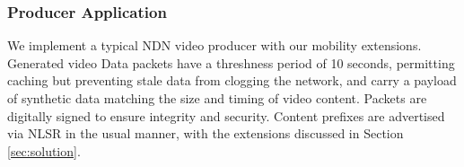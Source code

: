 \documentclass[10pt,conference]{IEEEtran}
\begin{document}
% 

\subsubsection{Producer Application}
We implement a typical NDN video producer with our mobility extensions.
Generated video Data packets have a threshness period of 10 seconds, permitting caching but preventing stale data from clogging the network, and carry a payload of synthetic data matching the size and timing of video content. Packets are digitally signed to ensure integrity and security.
Content prefixes are advertised via NLSR in the usual manner, with the extensions discussed in Section \ref{sec:solution}.
\end{document}
